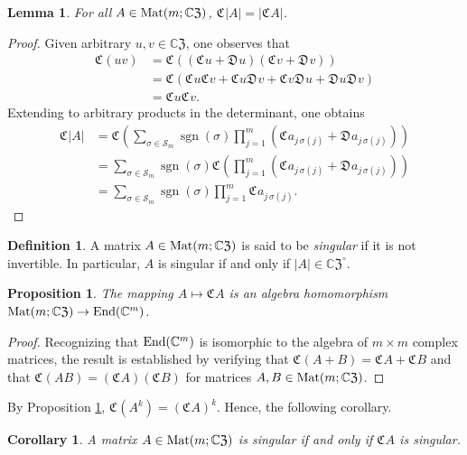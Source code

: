 \documentclass{article}
\newtheorem{lemma}[theorem]{Lemma}
\newtheorem{proposition}[theorem]{Proposition}
\newtheorem{corollary}[theorem]{Corollary}
\theoremstyle{definition}
\newtheorem{definition}[theorem]{Definition}
\newcommand{\zco}{\mathfrak{C}\mspace{1mu}}
\newcommand{\zdu}{\mathfrak{D}\mspace{1mu}}
\newcommand{\CZ}{\mathbb{C}\mathfrak{Z}}
\newcommand{\Mat}{{\rm Mat}}
\DeclareMathOperator{\sgn}{sgn}
\numberwithin{equation}{section}
\begin{document}
\begin{lemma}\label{scalar det}
For all $A\in\Mat(m;\CZ)$,  $\zco |A| = |\zco A|$. 
\end{lemma}

\begin{proof}
Given arbitrary $u,v\in \CZ$,  one observes that \begin{align*}
\zco (uv)&=\zco \left((\zco u+\zdu u)(\zco v+\zdu v)\right)\\
&=\zco \left(\zco u \zco v+\zco u\zdu v+\zco v\zdu u+\zdu u\zdu v\right)\\
&=\zco u \zco v.
\end{align*}
Extending to arbitrary products in the determinant, one obtains
\begin{align*}
\zco |A|
&=\zco \left(\sum_{\sigma\in \mathcal{S}_m}\sgn(\sigma)\prod_{j=1}^m (\zco a_{j\,\sigma(j)}+\zdu a_{j\,\sigma(j)})\right)\\
&=\sum_{\sigma\in \mathcal{S}_m}\sgn(\sigma)\zco \left(\prod_{j=1}^m (\zco a_{j\,\sigma(j)}+\zdu a_{j\,\sigma(j)})\right)\\
&=\sum_{\sigma\in \mathcal{S}_m}\sgn(\sigma)\prod_{j=1}^m \zco a_{j\,\sigma(j)}.
\end{align*}
\end{proof}

 \begin{definition}
A matrix $A\in\Mat(m;\CZ)$ is said to be {\em singular} if it is not invertible. In particular, $A$ is singular if and only if $|A|\in\CZ^\circ$.   
\end{definition}


\begin{proposition}\label{complex endo}
The mapping $A\mapsto \zco A$ is an algebra homomorphism  \break $\Mat(m;\CZ)\to {\rm End}(\mathbb{C}^m)$.
\end{proposition}

\begin{proof}
Recognizing that ${\rm End}(\mathbb{C}^m)$ is isomorphic to the algebra of $m\times m$ complex matrices, the result is established by verifying that $\zco(A+B)=\zco A+\zco B$ and that $\zco(AB)=(\zco A)(\zco B)$ for matrices $A,B\in \Mat(m;\CZ)$. \end{proof}

By Proposition \ref{complex endo}, $\zco(A^k)=(\zco A)^k$.   Hence, the following corollary.



\begin{corollary}
A matrix $A\in\Mat(m;\CZ)$ is singular if and only if $\zco A$ is singular.    
\end{corollary}
\end{document}
